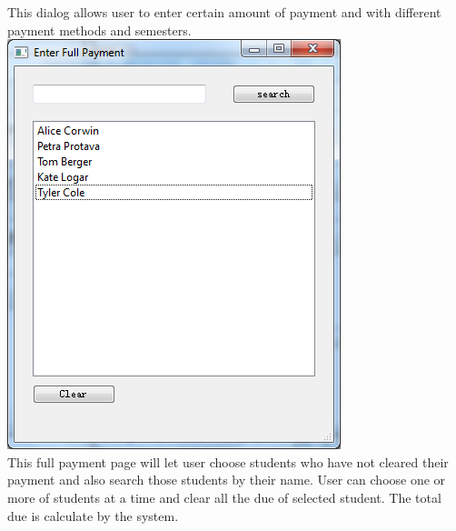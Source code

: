 This dialog allows user to enter certain amount of payment and with different payment methods and semesters.\\
\includegraphics[scale=0.5]{pics/full_pay.png}\\
This full payment page will let user choose students who have not cleared their payment and also search those students by their name. User can choose one or more of students at a time and clear all the due of selected student. The total due is calculate by the system.

